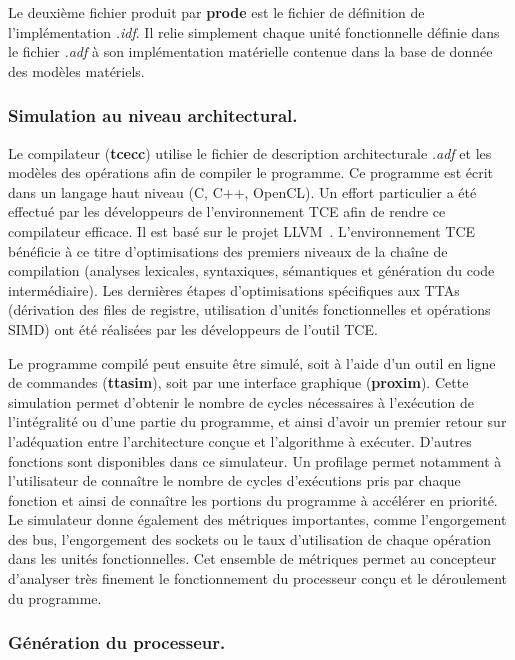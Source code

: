 Le deuxième fichier produit par \textbf{prode} est le fichier de définition de l'implémentation \textit{.idf}. Il relie simplement chaque unité fonctionnelle définie dans le fichier \textit{.adf} à son implémentation matérielle contenue dans la base de donnée des modèles matériels.

\subsubsection{Simulation au niveau architectural.}

Le compilateur (\textbf{tcecc}) utilise le fichier de description architecturale \textit{.adf} et les modèles des opérations afin de compiler le programme. Ce programme est écrit dans un langage haut niveau (C, C++, OpenCL). Un effort particulier a été effectué par les développeurs de l'environnement TCE afin de rendre ce compilateur efficace. Il est basé sur le projet LLVM~\cite{lattner_llvm:_2004}. L'environnement TCE bénéficie à ce titre d'optimisations des premiers niveaux de la chaîne de compilation (analyses lexicales, syntaxiques, sémantiques et génération du code intermédiaire). Les dernières étapes d'optimisations spécifiques aux TTAs (dérivation des files de registre, utilisation d'unités fonctionnelles et opérations SIMD) ont été réalisées par les développeurs de l'outil TCE.

Le programme compilé peut ensuite être simulé, soit à l'aide d'un outil en ligne de commandes (\textbf{ttasim}), soit par une interface graphique (\textbf{proxim}). Cette simulation permet d'obtenir le nombre de cycles nécessaires à l'exécution de l'intégralité ou d'une partie du programme, et ainsi d'avoir un premier retour sur l'adéquation entre l'architecture conçue et l'algorithme à exécuter. D'autres fonctions sont disponibles dans ce simulateur. Un profilage permet notamment à l'utilisateur de connaître le nombre de cycles d'exécutions pris par chaque fonction et ainsi de connaître les portions du programme à accélérer en priorité. Le simulateur donne également des métriques importantes, comme l'engorgement des bus, l'engorgement des sockets ou le taux d'utilisation de chaque opération dans les unités fonctionnelles. Cet ensemble de métriques permet au concepteur d'analyser très finement le fonctionnement du processeur conçu et le déroulement du programme.

\subsubsection{Génération du processeur.}

